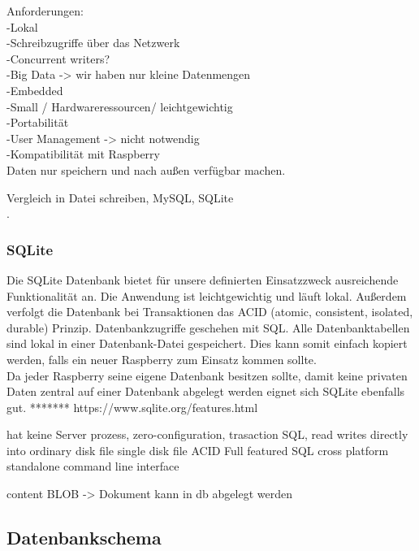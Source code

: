 Anforderungen:\\
-Lokal \\
-Schreibzugriffe über das Netzwerk\\
-Concurrent writers?\\
-Big Data -> wir haben nur kleine Datenmengen\\
-Embedded\\
-Small / Hardwareressourcen/ leichtgewichtig\\
-Portabilität\\
-User Management -> nicht notwendig\\
-Kompatibilität mit Raspberry\\

Daten nur speichern und nach außen verfügbar machen.

Vergleich in Datei schreiben, MySQL, SQLite\\
.
\subsubsection{SQLite}
Die SQLite Datenbank bietet für unsere definierten Einsatzzweck ausreichende Funktionalität an. Die Anwendung ist leichtgewichtig und läuft lokal. Außerdem verfolgt die Datenbank bei Transaktionen das ACID (atomic, consistent, isolated, durable) Prinzip. Datenbankzugriffe geschehen mit SQL. Alle Datenbanktabellen sind lokal in einer Datenbank-Datei gespeichert. Dies kann somit einfach kopiert werden, falls ein neuer Raspberry zum Einsatz kommen sollte.\\
Da jeder Raspberry seine eigene Datenbank besitzen sollte, damit keine privaten Daten zentral auf einer Datenbank abgelegt werden eignet sich SQLite ebenfalls gut. 
*******
https://www.sqlite.org/features.html

hat keine Server prozess, zero-configuration, trasaction SQL, read writes directly into ordinary disk file
single disk file 
ACID
Full featured SQL
cross platform
standalone command line interface

content BLOB -> Dokument kann in db abgelegt werden


\subsection{Datenbankschema}

